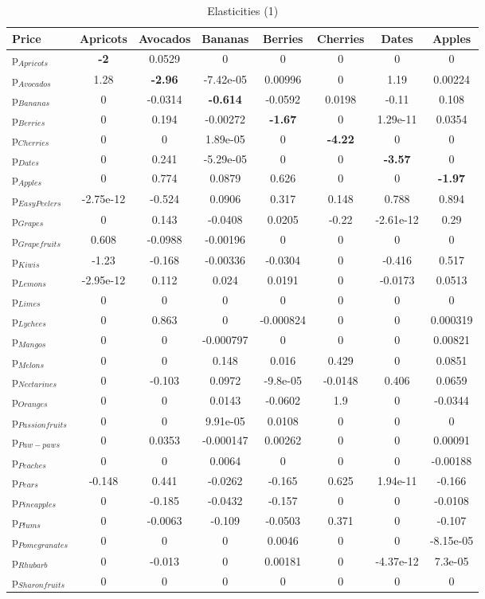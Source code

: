 \documentclass[11pt]{article}
\begin{document}
\begin{table}[h]
\caption{Elasticities (1)}
\label{table:elasticities 1}
\begin{center}
\begin{tabular}{lccccccc} \hline \hline
Price &Apricots &Avocados &Bananas &Berries &Cherries &Dates &Apples \\ \hline
p$_{Apricots}$ &\textbf{-2} &0.0529 &0 &0 &0 &0 &0 \\
p$_{Avocados}$ &1.28 &\textbf{-2.96} &-7.42e-05 &0.00996 &0 &1.19 &0.00224 \\
p$_{Bananas}$ &0 &-0.0314 &\textbf{-0.614} &-0.0592 &0.0198 &-0.11 &0.108 \\
p$_{Berries}$ &0 &0.194 &-0.00272 &\textbf{-1.67} &0 &1.29e-11 &0.0354 \\
p$_{Cherries}$ &0 &0 &1.89e-05 &0 &\textbf{-4.22} &0 &0 \\
p$_{Dates}$ &0 &0.241 &-5.29e-05 &0 &0 &\textbf{-3.57} &0 \\
p$_{Apples}$ &0 &0.774 &0.0879 &0.626 &0 &0 &\textbf{-1.97} \\
p$_{Easy Peelers}$ &-2.75e-12 &-0.524 &0.0906 &0.317 &0.148 &0.788 &0.894 \\
p$_{Grapes}$ &0 &0.143 &-0.0408 &0.0205 &-0.22 &-2.61e-12 &0.29 \\
p$_{Grapefruits}$ &0.608 &-0.0988 &-0.00196 &0 &0 &0 &0 \\
p$_{Kiwis}$ &-1.23 &-0.168 &-0.00336 &-0.0304 &0 &-0.416 &0.517 \\
p$_{Lemons}$ &-2.95e-12 &0.112 &0.024 &0.0191 &0 &-0.0173 &0.0513 \\
p$_{Limes}$ &0 &0 &0 &0 &0 &0 &0 \\
p$_{Lychees}$ &0 &0.863 &0 &-0.000824 &0 &0 &0.000319 \\
p$_{Mangos}$ &0 &0 &-0.000797 &0 &0 &0 &0.00821 \\
p$_{Melons}$ &0 &0 &0.148 &0.016 &0.429 &0 &0.0851 \\
p$_{Nectarines}$ &0 &-0.103 &0.0972 &-9.8e-05 &-0.0148 &0.406 &0.0659 \\
p$_{Oranges}$ &0 &0 &0.0143 &-0.0602 &1.9 &0 &-0.0344 \\
p$_{Passion fruits}$ &0 &0 &9.91e-05 &0.0108 &0 &0 &0 \\
p$_{Paw-paws}$ &0 &0.0353 &-0.000147 &0.00262 &0 &0 &0.00091 \\
p$_{Peaches}$ &0 &0 &0.0064 &0 &0 &0 &-0.00188 \\
p$_{Pears}$ &-0.148 &0.441 &-0.0262 &-0.165 &0.625 &1.94e-11 &-0.166 \\
p$_{Pineapples}$ &0 &-0.185 &-0.0432 &-0.157 &0 &0 &-0.0108 \\
p$_{Plums}$ &0 &-0.0063 &-0.109 &-0.0503 &0.371 &0 &-0.107 \\
p$_{Pomegranates}$ &0 &0 &0 &0.0046 &0 &0 &-8.15e-05 \\
p$_{Rhubarb}$ &0 &-0.013 &0 &0.00181 &0 &-4.37e-12 &7.3e-05 \\
p$_{Sharon fruits}$ &0 &0 &0 &0 &0 &0 &0 \\
\end{tabular}
\end{center}
\end{table}
\end{document}
